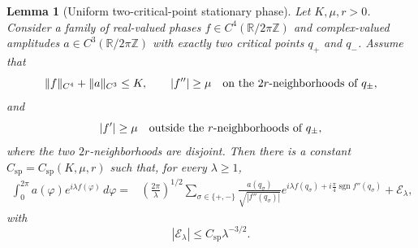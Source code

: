 \documentclass[12pt]{article}
\numberwithin{equation}{section}
\newtheorem{lemma}[theorem]{Lemma}
\numberwithin{equation}{section}
\begin{document}
\begin{lemma}[Uniform two-critical-point stationary phase]
\label{lem:uniform-SP}
Let $K,\mu,r>0$. Consider a family of real-valued phases
$f\in C^4\left(\mathbb R/2\pi\mathbb Z\right)$ and complex-valued amplitudes
$a\in C^3\left(\mathbb R/2\pi\mathbb Z\right)$ with exactly two critical points
$q_+$ and $q_-$. Assume that
\begin{equation*}\label{eq:abstract-SP-bounds}
 \|f\|_{C^4}+\|a\|_{C^3}\leq K,
 \qquad \left|f''\right|\geq \mu
 \quad\hbox{on the $2r$-neighborhoods of }q_\pm,
\end{equation*}
and
\begin{equation}\label{eq:abstract-nonstationary}
 \left|f'\right|\geq \mu
 \quad\hbox{outside the $r$-neighborhoods of }q_\pm,
\end{equation}
where the two $2r$-neighborhoods are disjoint. Then there is a constant
$C_{\mathrm{sp}}=C_{\mathrm{sp}}(K,\mu,r)$ such that, for every $\lambda\geq1$,
\begin{align*}
\int_0^{2\pi}a(\varphi)e^{i\lambda f(\varphi)}\,d\varphi
={}&\left(\frac{2\pi}{\lambda}\right)^{1/2}
\sum_{\sigma\in\{+,-\}}
\frac{a(q_\sigma)}{\sqrt{\left|f''(q_\sigma)\right|}}
e^{i\lambda f\left(q_\sigma\right)
+i\frac{\pi}{4}\operatorname{sgn}f''\left(q_\sigma\right)}
+\mathcal E_\lambda,
\label{eq:abstract-SP}
\end{align*}
with
\begin{equation}\label{eq:abstract-SP-error}
 \left|\mathcal E_\lambda\right|\leq C_{\mathrm{sp}}\lambda^{-3/2}.
\end{equation}
\end{lemma}
\end{document}
